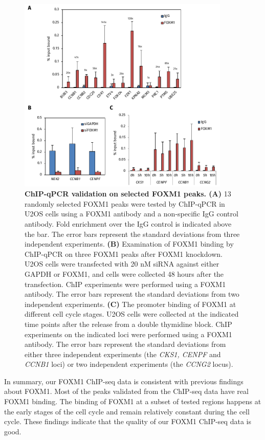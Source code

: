 \begin{figure}[!h]
    \centering
    \includegraphics[width=0.9\textwidth]{chapter3/figures_foxm1/fig17.pdf}
    \caption[ChIP-qPCR validation on selected FOXM1 peaks]{\textbf{ChIP-qPCR validation on selected FOXM1 peaks. (A)} 13 randomly selected FOXM1 peaks were tested by ChIP-qPCR in U2OS cells using a FOXM1 antibody and a non-specific IgG control antibody. Fold enrichment over the IgG control is indicated above the bar. The error bars represent the standard deviations from three independent experiments. \textbf{(B)} Examination of FOXM1 binding by ChIP-qPCR on three FOXM1 peaks after FOXM1 knockdown. U2OS cells were transfected with 20 nM siRNA against either GAPDH or FOXM1, and cells were collected 48 hours after the transfection. ChIP experiments were performed using a FOXM1 antibody. The error bars represent the standard deviations from two independent experiments. \textbf{(C)} The promoter binding of FOXM1 at different cell cycle stages. U2OS cells were collected at the indicated time points after the release from a double thymidine block. ChIP experiments on the indicated loci were performed using a FOXM1 antibody. The error bars represent the standard deviations from either three independent experiments (the \textit{CKS1, CENPF} and \textit{CCNB1} loci) or two independent experiments (the \textit{CCNG2} locus).}
    \label{fig:fig17}
\end{figure}

In summary, our FOXM1 ChIP-seq data is consistent with previous findings about FOXM1. Most of the peaks validated from the ChIP-seq data have real FOXM1 binding. The binding of FOXM1 at a subset of tested regions happens at the early stages of the cell cycle and remain relatively constant during the cell cycle. These findings indicate that the quality of our FOXM1 ChIP-seq data is good.

